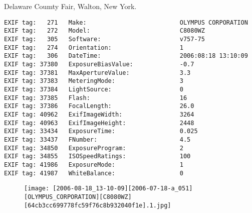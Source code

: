 \section{\protect{}}
\noindent Delaware Coumty Fair, Walton, New York.
\noindent
\begin{lstlisting}
EXIF tag:   271   Make:                          OLYMPUS CORPORATION
EXIF tag:   272   Model:                         C8080WZ
EXIF tag:   305   Software:                      v757-75
EXIF tag:   274   Orientation:                   1
EXIF tag:   306   DateTime:                      2006:08:18 13:10:09
EXIF tag: 37380   ExposureBiasValue:             -0.7
EXIF tag: 37381   MaxApertureValue:              3.3
EXIF tag: 37383   MeteringMode:                  3
EXIF tag: 37384   LightSource:                   0
EXIF tag: 37385   Flash:                         16
EXIF tag: 37386   FocalLength:                   26.0
EXIF tag: 40962   ExifImageWidth:                3264
EXIF tag: 40963   ExifImageHeight:               2448
EXIF tag: 33434   ExposureTime:                  0.025
EXIF tag: 33437   FNumber:                       4.5
EXIF tag: 34850   ExposureProgram:               2
EXIF tag: 34855   ISOSpeedRatings:               100
EXIF tag: 41986   ExposureMode:                  1
EXIF tag: 41987   WhiteBalance:                  0

\end{lstlisting}
\clearpage
\begin{figure}
\raggedleft
\texttt{[image: [2006-08-18\_13-10-09][2006-07-18-a\_051][OLYMPUS\_CORPORATION][C8080WZ][64cb3cc699778fc59f76c8b932040f1e].1.jpg]}
\end{figure}


\clearpage
